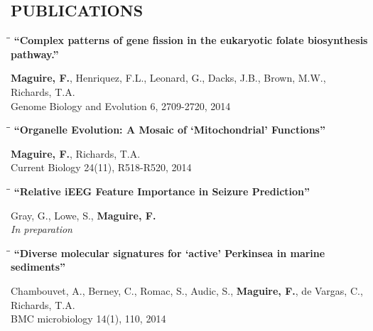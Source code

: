 \documentclass{res}
\begin{document}
\begin{resume}
\section{PUBLICATIONS} 
\vspace{-0.05in}
 \begin{tabbing}
   \hspace{2.3in}\= \hspace{2.6in}\= \kill
   {\bf ``Complex patterns of gene fission in the eukaryotic folate biosynthesis pathway.''\\
  }
   \end{tabbing}\vspace{-20pt}
   \textbf{Maguire, F.}, Henriquez, F.L., Leonard, G., Dacks, J.B., Brown, M.W.,  Richards, T.A.\\
   Genome Biology and Evolution 6, 2709-2720, 2014\\

\vspace{-0.2in}
\begin{tabbing}
   \hspace{2.3in}\= \hspace{2.6in}\= \kill
   {\bf ``Organelle Evolution: A Mosaic of `Mitochondrial' Functions''} 
   \end{tabbing}\vspace{-20pt}
   \textbf{Maguire, F.}, Richards, T.A.\\ 
    Current Biology 24(11), R518-R520, 2014\\

\vspace{-0.2in}

\begin{tabbing}
   \hspace{2.3in}\= \hspace{2.6in}\= \kill
   {\bf ``Relative iEEG Feature Importance in Seizure Prediction''} 
   \end{tabbing}\vspace{-20pt}
   Gray, G., Lowe, S., \textbf{Maguire, F.}\\ 
    \textit{In preparation}\\
\vspace{-0.2in}

\begin{tabbing}
   \hspace{2.3in}\= \hspace{2.6in}\= \kill
   {\bf ``Diverse molecular signatures for `active' Perkinsea in marine sediments''} 
   \end{tabbing}\vspace{-20pt}
   Chambouvet, A., Berney, C., Romac, S., Audic, S., \textbf{Maguire, F.}, de Vargas, C., Richards, T.A.\\
     BMC microbiology 14(1), 110, 2014\\


\end{resume}
\end{document}
